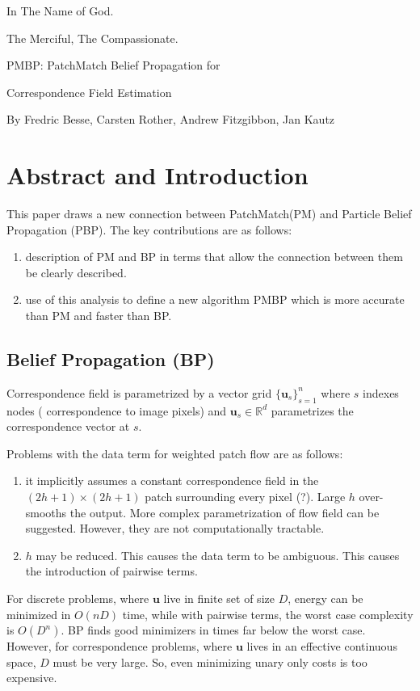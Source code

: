 \documentclass[a4paper,12pt]{article}
\begin{document}
\begin{center}
In The Name of God.

The Merciful, The Compassionate.
\vskip 1cm
{\Large\bfseries{PMBP: PatchMatch Belief Propagation for

Correspondence Field Estimation}}

\vskip 0.2cm
\tiny{By Fredric Besse, Carsten Rother, Andrew Fitzgibbon, Jan Kautz}
\end{center}

\section{Abstract and Introduction}
This paper draws a new connection between PatchMatch(PM) and Particle Belief Propagation (PBP).
The key contributions are as follows:
\begin{enumerate}
\item description of PM and BP in terms that allow the connection between them be clearly described.
\item use of this analysis to define a new algorithm PMBP which is more accurate than PM and faster than BP. 
\end{enumerate}

\subsection*{Belief Propagation (BP)}
Correspondence field is parametrized by a vector grid $\{\mathbf{u}_s\}_{s=1}^{n}$ where $s$ indexes nodes ( correspondence to image pixels) and  $\mathbf{u}_s \in \mathbb{R}^d$ parametrizes the correspondence vector at $s$.

Problems with the data term for weighted patch flow are as follows:
\begin{enumerate}
\item it implicitly assumes a constant correspondence field in the $(2h+1)\times(2h+1)$ patch surrounding every pixel (?). Large $h$ over-smooths the output. More complex parametrization of flow field can be suggested. However, they are not computationally tractable.
\item $h$ may be reduced. This causes the data term to be ambiguous. This causes the introduction of pairwise terms.
\end{enumerate}
For discrete problems, where $\mathbf{u}$ live in finite set of size $D$, energy can be minimized in $O(nD)$ time, while with pairwise terms, the worst case complexity is $O(D^n)$. BP finds good minimizers in times far below the worst case. However, for correspondence problems, where $\mathbf{u}$ lives in an effective continuous space, $D$ must be very large. So, even minimizing unary only costs is too expensive.
\end{document}
